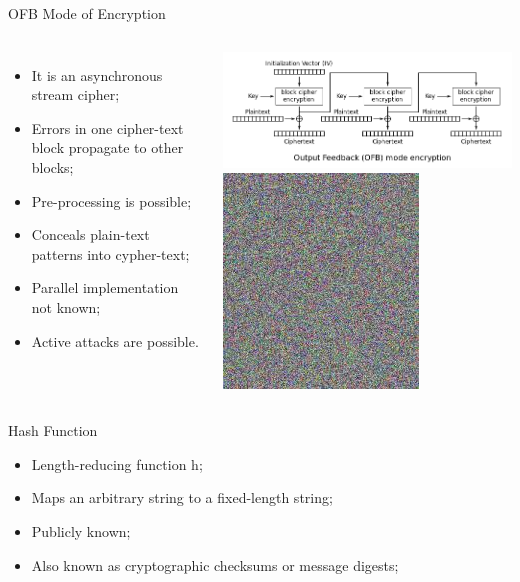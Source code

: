 \documentclass[12pt,table,xcolor={dvipsnames}]{beamer}
\begin{document}
\begin{frame}{OFB Mode of Encryption}
\begin{columns}
\begin{itemize}
\item It is an asynchronous stream cipher;\pause
\item Errors in one cipher-text block propagate to other blocks;\pause
\item Pre-processing is possible;\pause
\item Conceals plain-text patterns into cypher-text;\pause
\item Parallel implementation not known;\pause
\item Active attacks are possible.\pause
\end{itemize}
\begin{center}
\includegraphics[scale=.25]{OFB_encryption.png}\pause\\
\includegraphics[scale=.35]{Tux_secure.jpg}
\end{center}
\end{columns}
\end{frame}

\begin{frame}{Hash Function}
\begin{itemize}
\item Length-reducing function h;\pause
\item Maps an arbitrary string to a fixed-length string;\pause
\item Publicly known;\pause
\item Also known as cryptographic checksums or message digests;\pause
\end{itemize}
\end{frame}
\end{document}
